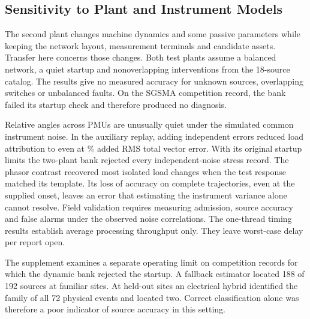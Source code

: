 \subsection{Sensitivity to Plant and Instrument Models}

The second plant changes machine dynamics and some passive parameters
while keeping the network layout, measurement terminals and candidate
assets. Transfer here concerns those changes. Both test plants assume a
balanced network, a quiet startup and nonoverlapping interventions from
the 18-source catalog. The results give no measured accuracy for unknown
sources, overlapping switches or unbalanced faults. On the SGSMA competition record, the bank failed its startup check and therefore
produced no diagnosis.

Relative angles across PMUs are unusually quiet under the simulated
common instrument noise. In the auxiliary replay, adding independent
errors reduced load attribution to \RevNoiseTVEaLoad{} even at
\RevNoiseAddedRmsLow{}\% added RMS total vector error. With its original
startup limits the two-plant bank rejected every independent-noise stress
record. The phasor contrast recovered most isolated load changes when
the test response matched its template. Its loss of accuracy on
complete trajectories, even at the supplied onset, leaves an error
that estimating the instrument variance alone cannot resolve. Field
validation requires measuring admission, source accuracy and false
alarms under the observed noise correlations. The one-thread timing results establish average
processing throughput only. They leave worst-case delay per report open.

The supplement examines a separate operating limit on competition
records for which the dynamic bank rejected the startup. A fallback
estimator located 188 of 192 sources at familiar sites. At held-out sites
an electrical hybrid identified the family of all 72 physical events
and located two. Correct classification alone was therefore a poor
indicator of source accuracy in this setting.

